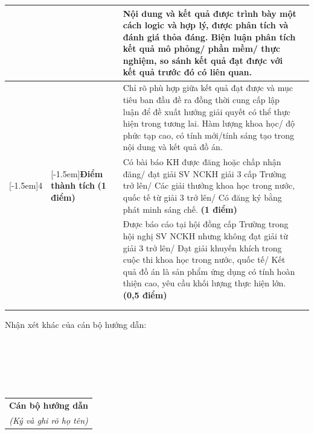 \begin{center}
\begin{tabular}{|>{\centering\arraybackslash}p{0.8cm}|>{\centering\arraybackslash}p{2.3cm}|>{\raggedright\arraybackslash}p{10.4cm}|>{\centering\arraybackslash}p{1.3cm}|}
  & & Nội dung và kết quả được trình bày một cách logic và hợp lý, được phân tích và đánh giá thỏa đáng. Biện luận phân tích kết quả mô phỏng/ phần mềm/ thực nghiệm, so sánh kết quả đạt được với kết quả trước đó có liên quan. & \\ \cline{3-4}
  & & Chỉ rõ phù hợp giữa kết quả đạt được và mục tiêu ban đầu đề ra đồng thời cung cấp lập luận để đề xuất hướng giải quyết có thể thực hiện trong tương lai. Hàm lượng khoa học/ độ phức tạp cao, có tính mới/tính sáng tạo trong nội dung và kết quả đồ án. & \\ \hline
\multirow{2}{*}[-1.5em]{4} & \multirow{2}{\dimexpr 2.3cm - 2\tabcolsep \relax}[-1.5em]{\centering \textbf{Điểm thành tích} \newline \textbf{(1 điểm)}} & Có bài báo KH được đăng hoặc chấp nhận đăng/ đạt giải SV NCKH giải 3 cấp Trường trở lên/ Các giải thưởng khoa học trong nước, quốc tế từ giải 3 trở lên/ Có đăng ký bằng phát minh sáng chế. \textbf{(1 điểm)} & \\ \cline{3-4}
  & & Được báo cáo tại hội đồng cấp Trường trong hội nghị SV NCKH nhưng không đạt giải từ giải 3 trở lên/ Đạt giải khuyến khích trong cuộc thi khoa học trong nước, quốc tế/ Kết quả đồ án là sản phẩm ứng dụng có tính hoàn thiện cao, yêu cầu khối lượng thực hiện lớn. \textbf{(0,5 điểm)} & \\ \hline
\multicolumn{3}{|r|}{\textbf{Điểm tổng các tiêu chí:}} & \\ \hline
\multicolumn{3}{|r|}{\textbf{Điểm hướng dẫn:}} & \\ \hline
\end{tabular}
\end{center}

\newpage
\thispagestyle{empty}
\noindent Nhận xét khác của cán bộ hướng dẫn:\\
\noindent\makebox[\textwidth]{\dotfill}\\
\noindent\makebox[\textwidth]{\dotfill}\\
\noindent\makebox[\textwidth]{\dotfill}\\
\noindent\makebox[\textwidth]{\dotfill}\\
\noindent\makebox[\textwidth]{\dotfill}\\
\noindent\makebox[\textwidth]{\dotfill}

\vspace{40pt}
\hfill
\begin{tabular}{c}
\textbf{Cán bộ hướng dẫn} \\
\textit{(Ký và ghi rõ họ tên)}
\end{tabular}
\newpage
